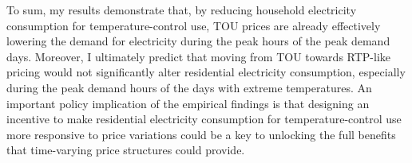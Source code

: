 To sum, my results demonstrate that, by reducing household electricity consumption for temperature-control use, TOU prices are already effectively lowering the demand for electricity during the peak hours of the peak demand days. Moreover, I ultimately predict that moving from TOU towards RTP-like pricing would not significantly alter residential electricity consumption, especially during the peak demand hours of the days with extreme temperatures. An important policy implication of the empirical findings is that designing an incentive to make residential electricity consumption for temperature-control use more responsive to price variations could be a key to unlocking the full benefits that time-varying price structures could provide.
